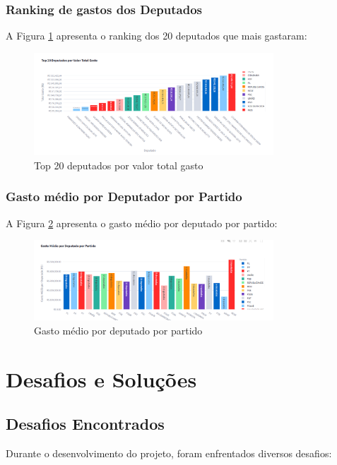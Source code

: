 \documentclass[12pt,a4paper]{article}
\begin{document}
\subsubsection{Ranking de gastos dos Deputados}
A Figura \ref{fig:deputados_ranking.png} apresenta o ranking dos 20 deputados que mais gastaram:

\begin{figure}[H]
\centering
\includegraphics[width=0.8\textwidth]{imagens/deputados_ranking.png}
\caption{Top 20 deputados por valor total gasto}
\label{fig:deputados_ranking.png}
\end{figure}

\subsubsection{Gasto médio por Deputador por Partido}
A Figura \ref{fig:gasto_deputado_partido.png} apresenta o gasto médio por deputado por partido:

\begin{figure}[H]
\centering
\includegraphics[width=0.8\textwidth]{imagens/gasto_deputado_partido.png}
\caption{Gasto médio por deputado por partido}
\label{fig:gasto_deputado_partido.png}
\end{figure}

\section{Desafios e Soluções}
\subsection{Desafios Encontrados}
Durante o desenvolvimento do projeto, foram enfrentados diversos desafios:
\end{document}
